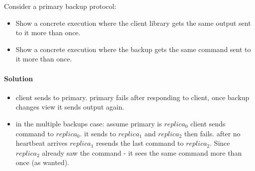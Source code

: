 
\begin{xca}[Quiz 1.J]
    Consider a primary backup protocol:
    \begin{itemize} 
        \item Show a concrete execution where the client library gets the same output sent to it more than once.
        \item Show a concrete execution where the backup gets the same command sent to it more than once.
    \end{itemize}

    \paragraph{Solution}
    \begin{itemize}
        \item client sends to primary. primary fails after responding to client, once backup changes view it sends output again.
        \item in the multiple backups case: assume primary is $replica_0$
         client sends command to $replica_0$. 
         it sends to $replica_1$ and $replica_2$ then fails.
         after no heartbeat arrives $replica_1$ resends the last command to $replica_2$. 
         Since $replica_2$ already saw the command - it sees the same command more than once (as wanted).
    \end{itemize}
\end{xca}